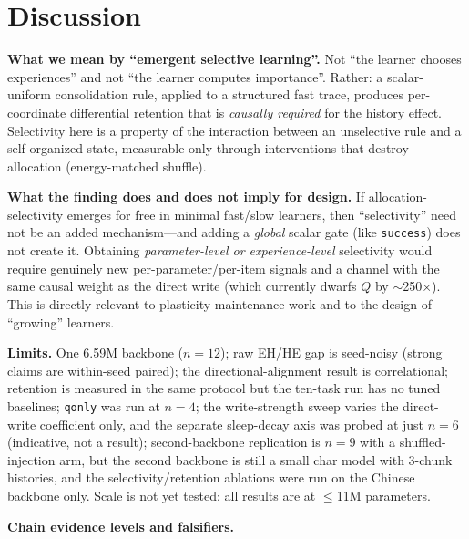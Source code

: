 \documentclass{article} %
\begin{document}
\section{Discussion}
\label{sec:discussion}

\textbf{What we mean by ``emergent selective learning''.} Not ``the learner chooses experiences'' and not ``the learner computes importance''. Rather: a scalar-uniform consolidation rule, applied to a structured fast trace, produces per-coordinate differential retention that is \emph{causally required} for the history effect. Selectivity here is a property of the interaction between an unselective rule and a self-organized state, measurable only through interventions that destroy allocation (energy-matched shuffle).

\textbf{What the finding does and does not imply for design.} If allocation-selectivity emerges for free in minimal fast/slow learners, then ``selectivity'' need not be an added mechanism---and adding a \emph{global} scalar gate (like \texttt{success}) does not create it. Obtaining \emph{parameter-level or experience-level} selectivity would require genuinely new per-parameter/per-item signals and a channel with the same causal weight as the direct write (which currently dwarfs $Q$ by $\sim$250$\times$). This is directly relevant to plasticity-maintenance work \citep{dohare2024loss, lyle2022understanding, nikishin2022primacy} and to the design of ``growing'' learners.

\textbf{Limits.} One 6.59M backbone ($n{=}12$); raw EH/HE gap is seed-noisy (strong claims are within-seed paired); the directional-alignment result is correlational; retention is measured in the same protocol but the ten-task run has no tuned baselines; \texttt{qonly} was run at $n{=}4$; the write-strength sweep varies the direct-write coefficient only, and the separate sleep-decay axis was probed at just $n{=}6$ (indicative, not a result); second-backbone replication is $n{=}9$ with a shuffled-injection arm, but the second backbone is still a small char model with 3-chunk histories, and the selectivity/retention ablations were run on the Chinese backbone only. Scale is not yet tested: all results are at $\leq$11M parameters.

\textbf{Chain evidence levels and falsifiers.}
\end{document}
